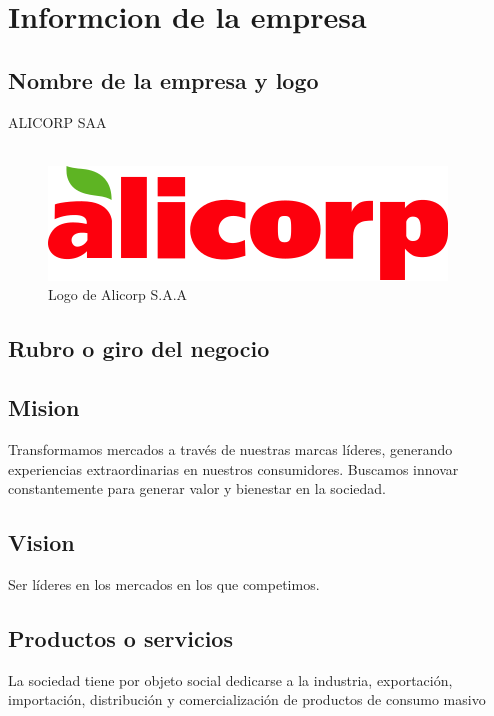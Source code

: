 \section{Informcion de la empresa}

\subsection{Nombre de la empresa y logo}
ALICORP SAA\\ \\
\begin{figure}[!ht]
    \centering
    \includegraphics[scale = 0.6]{./figuras/logo_alicorp.png}	 
    \caption{Logo de Alicorp S.A.A}
\label{fig:logo}
\end{figure}


\subsection{Rubro o giro del negocio}

\subsection{Mision}
Transformamos mercados a través de nuestras marcas líderes, generando experiencias extraordinarias en nuestros consumidores. Buscamos innovar constantemente para generar valor y bienestar en la sociedad.

\subsection{Vision}
Ser líderes en los mercados en los que competimos.
\subsection{Productos o servicios}
La sociedad tiene por objeto social dedicarse a la industria, exportación, importación, distribución y comercialización de productos de consumo masivo

